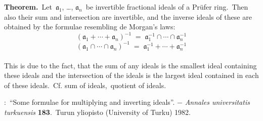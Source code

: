 \documentclass[12pt]{article}
\theoremstyle{definition}
\begin{document}
\textbf{Theorem.}\, Let\, $\mathfrak{a}_1$, \ldots, $\mathfrak{a}_n$\, be invertible fractional ideals of a Pr\"ufer ring.\, Then also their sum and intersection are invertible, and the inverse ideals of these are obtained by the formulae resembling de Morgan's laws:
$$(\mathfrak{a}_1+\cdots+\mathfrak{a}_n)^{-1} \;=\; 
\mathfrak{a}_1^{-1}\cap\cdots\cap\mathfrak{a}_n^{-1}$$
$$(\mathfrak{a}_1\cap\cdots\cap\mathfrak{a}_n)^{-1} \;=\;  
\mathfrak{a}_1^{-1}+\cdots+\mathfrak{a}_n^{-1}
$$\\


This  is due to the fact, that the sum of any ideals is the smallest ideal containing these ideals and the intersection of the ideals is the largest ideal contained in each of these ideals.\, Cf. sum of ideals,\, quotient of ideals.

\begin{thebibliography}{9}
:\, ``Some formulae for multiplying and inverting ideals''. $-$ \emph{Annales universitatis turkuensis} \textbf{183}.\, Turun yliopisto (University of Turku) 1982.
\end{thebibliography}
\end{document}
